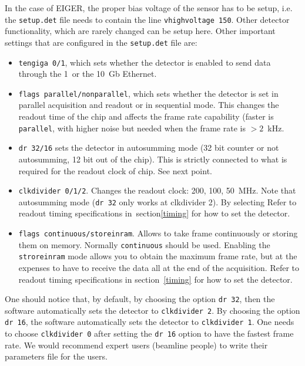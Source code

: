 \documentclass{article}
\newcommand{\E}{EIGER\xspace}
\begin{document}
In the case of \E, the proper bias voltage of the sensor has to be setup, i.e. the {\tt{setup.det}} file needs to contain the line {\tt{vhighvoltage 150}}. Other detector functionality, which are rarely changed can be setup here. 
Other important settings that are configured in the {\tt{setup.det}} file are:
\begin{itemize}
\item {\tt{tengiga 0/1}}, which sets whether the detector is enabled to send data through the 1~or the 10~Gb Ethernet.
\item {\tt{flags parallel/nonparallel}}, which sets whether the detector is set in parallel acquisition and readout or in sequential mode. This changes the readout time of the chip and affects the frame rate capability (faster is {\tt{parallel}}, with higher noise but needed when the frame rate is $>2$~kHz. 
\item {\tt{dr 32/16}} sets the detector in autosumming mode (32 bit counter or not autosumming, 12 bit out of the chip). This is strictly connected to what is required for the readout clock of chip. See next point.
\item {\tt{clkdivider 0/1/2}}. Changes the readout clock: 200, 100, 50~MHz. Note that autosumming mode ({\tt{dr 32}} only works at {clkdivider 2}). By selecting Refer to readout timing specifications in~section\ref{timing} for how to set the detector. 
\item {\tt{flags continuous/storeinram}}. Allows to take frame continuously or storing them on memory. Normally {\tt{continuous}} should be used. Enabling the  {\tt{stroreinram}} mode allows you to obtain the maximum frame rate, but at the expenses to have to receive the data all at the end of the acquisition. Refer to readout timing specifications in section~\ref{timing} for how to set the detector.
\end{itemize}

One should notice that, by default, by choosing the option {\tt{dr 32}}, then the software automatically sets the detector to  {\tt{clkdivider 2}}. By choosing the option {\tt{dr 16}}, the software automatically sets the detector to  {\tt{clkdivider 1}}. One needs to choose {\tt{clkdivider 0}} after setting the {\tt{dr 16}} option to have the fastest frame rate. 
We would recommend expert users (beamline people) to write their parameters file for the users. 
\end{document}
